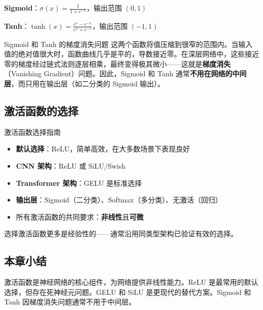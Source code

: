 \textbf{Sigmoid}：$\sigma(x) = \frac{1}{1 + e^{-x}}$，输出范围 $(0, 1)$

\textbf{Tanh}：$\tanh(x) = \frac{e^x - e^{-x}}{e^x + e^{-x}}$，输出范围 $(-1, 1)$

\begin{warningbox}{Sigmoid 和 Tanh 的梯度消失问题}
这两个函数将值压缩到很窄的范围内。当输入值的绝对值很大时，函数曲线几乎是平的，导数接近零。在深层网络中，这些接近零的梯度经过链式法则逐层相乘，最终变得极其微小——这就是\textbf{梯度消失}（Vanishing Gradient）问题。因此，Sigmoid 和 Tanh 通常\textbf{不用在网络的中间层}，而只用在输出层（如二分类的 Sigmoid 输出）。
\end{warningbox}

\subsection{激活函数的选择}

\begin{knowledgebox}{激活函数选择指南}
\begin{itemize}
    \item \textbf{默认选择}：ReLU，简单高效，在大多数场景下表现良好
    \item \textbf{CNN 架构}：ReLU 或 SiLU/Swish
    \item \textbf{Transformer 架构}：GELU 是标准选择
    \item \textbf{输出层}：Sigmoid（二分类）、Softmax（多分类）、无激活（回归）
    \item 所有激活函数的共同要求：\textbf{非线性}且\textbf{可微}
\end{itemize}
选择激活函数更多是经验性的——通常沿用同类型架构已验证有效的选择。
\end{knowledgebox}

\subsection{本章小结}

激活函数是神经网络的核心组件，为网络提供非线性能力。ReLU 是最常用的默认选择，但存在死神经元问题。GELU 和 SiLU 是更现代的替代方案。Sigmoid 和 Tanh 因梯度消失问题通常不用于中间层。


